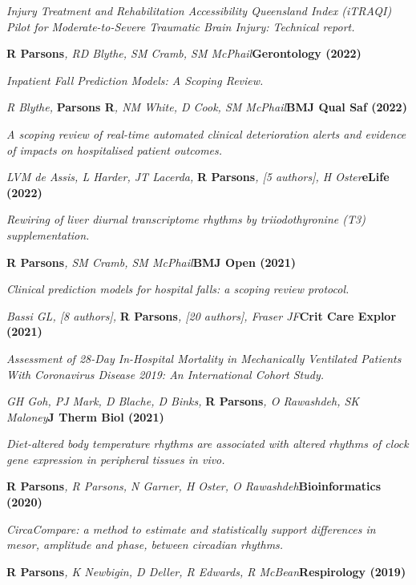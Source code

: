 	\textit{
        Injury Treatment and Rehabilitation Accessibility Queensland Index (iTRAQI) Pilot for Moderate-to-Severe \newline
        Traumatic Brain Injury: Technical report.
    }
\item
    \textbf{R Parsons}\textit{, RD Blythe, SM Cramb, SM McPhail}\textbf{\hfill Gerontology (2022)}\par
	\textit{Inpatient Fall Prediction Models: A Scoping Review.}
\item
	\textit{R Blythe, }\textbf{Parsons R}\textit{, NM White, D Cook, SM McPhail}\textbf{\hfill{BMJ Qual Saf (2022)}}\par
	\textit{A scoping review of real-time automated clinical deterioration alerts and evidence of impacts on hospitalised patient outcomes.}
\item
	\textit{LVM de Assis, L Harder, JT Lacerda, }\textbf{R Parsons}\textit{, [5 authors], H Oster}\textbf{\hfill eLife (2022)}\par 
    \textit{Rewiring of liver diurnal transcriptome rhythms by triiodothyronine (T3) supplementation.}
\item
    \textbf{R Parsons}\textit{, SM Cramb, SM McPhail}\textbf{\hfill BMJ Open (2021)}\par 
    \textit{Clinical prediction models for hospital falls: a scoping review protocol.}
\item
    \textit{Bassi GL, [8 authors], }\textbf{R Parsons}\textit{, [20 authors], Fraser JF}\textbf{\hfill Crit Care Explor (2021)}\par 
    \textit{Assessment of 28-Day In-Hospital Mortality in Mechanically Ventilated Patients With Coronavirus Disease 2019: An International Cohort Study.}
\item
    \textit{GH Goh, PJ Mark, D Blache, D Binks, }\textbf{R Parsons}\textit{, O Rawashdeh, SK Maloney}\textbf{\hfill J Therm Biol (2021)}\par 
    \textit{Diet-altered body temperature rhythms are associated with altered rhythms of clock gene expression in peripheral tissues in vivo.}
\item
    \textbf{R Parsons}\textit{, R Parsons, N Garner, H Oster, O Rawashdeh}\textbf{\hfill Bioinformatics (2020)}\par 
    \textit{CircaCompare: a method to estimate and statistically support differences in mesor, amplitude and phase, between circadian rhythms.}
\item
    \textbf{R Parsons}\textit{, K Newbigin, D Deller, R Edwards, R McBean}\textbf{\hfill Respirology (2019)}\par 
